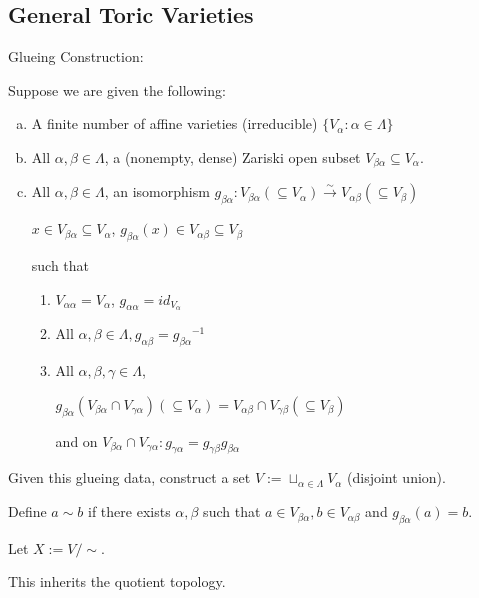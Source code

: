 \documentclass[a4paper,12pt]{amsart}
\newcommand{\iv}{\ensuremath{^{-1}}}
\begin{document}
\subsection{General Toric Varieties}
Glueing Construction:
\begin{Def}
	Suppose we are given the following:
	\begin{enumerate}[a)]
		\item A finite number of affine varieties (irreducible) $ \{V_\alpha: \alpha\in \Lambda\} $
		\item All $\alpha, \beta \in \Lambda$, a (nonempty, dense) Zariski open subset $V_{\beta\alpha}\subseteq V_\alpha$.
		\item All $\alpha, \beta \in \Lambda$, an isomorphism $ g_{\beta\alpha}: V_{\beta\alpha}(\subseteq V_\alpha)\xrightarrow{\sim}V_{\alpha\beta}(\subseteq V_\beta) $
		
		$x\in V_{\beta\alpha}\subseteq V_\alpha$, $g_{\beta\alpha}(x)\in V_{\alpha\beta}\subseteq V_\beta$
		
		such that
		\begin{enumerate}[1)]
			\item $V_{\alpha\alpha}=V_\alpha$, $g_{\alpha\alpha}=id_{V_\alpha}$
			\item All $\alpha, \beta \in \Lambda, g_{\alpha\beta}=g_{\beta\alpha}\iv$
			\item All $\alpha, \beta, \gamma \in \Lambda$,
			
			$g_{\beta\alpha}(V_{\beta\alpha}\cap V_{\gamma\alpha})(\subseteq V_\alpha)=V_{\alpha\beta}\cap V_{\gamma\beta}(\subseteq V_\beta)$
			
			and on $V_{\beta\alpha}\cap V_{\gamma\alpha}: g_{\gamma\alpha}=g_{\gamma\beta}g_{\beta\alpha}$
		\end{enumerate}
	\end{enumerate}
\end{Def}
Given this glueing data,
construct a set $V:=\sqcup_{\alpha\in\Lambda} V_\alpha$ (disjoint union).

Define $a\sim b$ if there exists $\alpha, \beta$ such that $a\in V_{\beta\alpha}, b\in V_{\alpha\beta}$ and $g_{\beta\alpha}(a)=b$.

Let $X:=V/\sim$.

This inherits the quotient topology.
\end{document}
